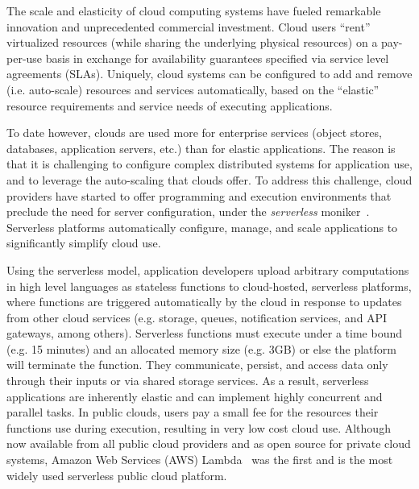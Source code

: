 The scale and elasticity of cloud computing systems have 
fueled remarkable innovation and unprecedented commercial 
investment.  Cloud users ``rent'' virtualized resources (while sharing
the underlying physical resources) on a pay-per-use basis
in exchange for availability guarantees specified via service level
agreements (SLAs). Uniquely, cloud systems can be configured 
to add and remove (i.e. auto-scale) resources and services
automatically, based on the ``elastic'' resource requirements and service needs 
of executing applications.

To date however, clouds are used more for
enterprise services (object stores, databases, application servers, etc.)
than for elastic applications.
The reason is that it is challenging to configure complex
distributed systems for application use, 
and to leverage the auto-scaling that
clouds offer. To address this challenge, cloud providers 
have started to offer programming and execution environments
that preclude the need for server configuration,
under the \textit{serverless} moniker~\cite{ref:jonas2017occupy,ref:onesteptwostep,ref:peeking}.  
Serverless platforms automatically configure, manage, and scale applications
to significantly simplify cloud use.

Using the serverless model, application developers upload arbitrary computations in high level languages as stateless functions to cloud-hosted, serverless platforms, where functions are triggered automatically by the cloud in response to updates from other cloud services (e.g. storage, queues, notification services, and API gateways, 
among others). Serverless functions must execute under a time bound (e.g. 15 minutes) and an allocated memory size 
(e.g. 3GB) or else the platform will terminate the function. They
communicate, persist, and access data only 
through their inputs or via shared storage services. As a result, serverless applications are inherently elastic and can 
implement highly concurrent and parallel tasks.
In public clouds, users pay a small fee for the resources their 
functions use during execution, resulting in very low cost cloud use.
Although now available from all public cloud providers and as open 
source for private cloud systems, 
Amazon Web Services (AWS) Lambda~\cite{ref:awslambdadg}
was the first and is the most widely used
serverless public cloud platform.

